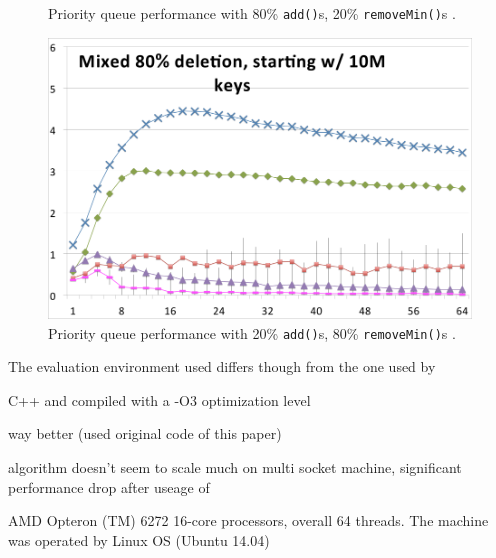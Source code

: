 \begin{figure}[htb]
\begin{minipage}[b]{.495\textwidth}
		\caption{Priority queue performance with 80\% \texttt{add()}s, 20\% \texttt{removeMin()}s \cite{braginsky_cbpq:_2016}.}
		\label{fig:cbpq_80}
	\end{minipage}
	\begin{minipage}[b]{.495\textwidth}
		\centering
		\includegraphics[width=\linewidth]{graphics/cbpq_20add_80.png}
		\caption{Priority queue performance with 20\% \texttt{add()}s, 80\% \texttt{removeMin()}s \cite{braginsky_cbpq:_2016}.}
		\label{fig:cbpq_20}
	\end{minipage}
\end{figure}

The evaluation environment used differs though from the one used by \citeauthor{calciu_adaptive_2014}

C++ and compiled with a -O3 optimization level

\cite{braginsky_cbpq:_2016, } way better (used original code of this paper)

algorithm doesn't seem to scale much on multi socket machine, significant performance drop after useage of

AMD Opteron (TM) 6272
16-core processors, overall 64 threads. The machine was operated by Linux OS
(Ubuntu 14.04)

